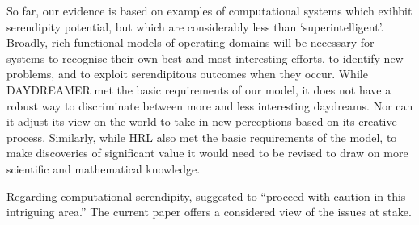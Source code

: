 So far, our evidence is based on examples of computational systems
which exihbit serendipity potential, but which are considerably less
than `superintelligent'.  Broadly, rich functional models of operating
domains will be necessary for systems to recognise their own best and
most interesting efforts, to identify new problems, and to exploit
serendipitous outcomes when they occur.  While {\sf DAYDREAMER} met
the basic requirements of our model, it does not have a robust way to
discriminate between more and less interesting daydreams.  Nor can it
adjust its view on the world to take in new perceptions based on its
creative process.  Similarly, while {\sf HRL} also met the basic
requirements of the model, to make discoveries of significant value it
would need to be revised to draw on more scientific and mathematical
knowledge.

Regarding computational serendipity, \citet{pease2013discussion}
suggested to ``proceed with caution in this intriguing area.''  The
current paper offers a considered view of the issues at stake.

